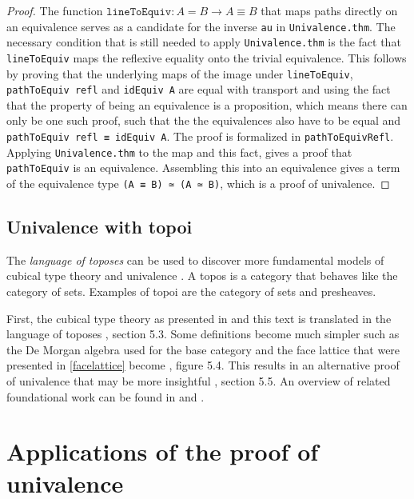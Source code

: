 \documentclass[12pt,a4paper,twoside,xetex]{book}
\newcommand{\keyword}[1]{\emph{#1}\index{#1}}
\newcommand{\op}[1]{\mathtt{#1}}
\begin{document}
\begin{proof}
The function $\op{lineToEquiv} : A = B \rightarrow A \equiv B$ that maps paths 
directly on an equivalence serves as a candidate for the inverse \texttt{au} in 
\texttt{Univalence.thm}. The necessary condition that is still needed to apply 
\texttt{Univalence.thm} is the fact that \texttt{lineToEquiv} maps the 
reflexive equality onto the trivial equivalence. This follows by proving that 
the underlying maps of the image under \texttt{lineToEquiv}, 
\texttt{pathToEquiv refl} and \texttt{idEquiv A} are equal with transport and 
using the fact that the property of being an equivalence is a proposition, 
which means there can only be one such proof, such that the the equivalences 
also have to be equal and \texttt{pathToEquiv refl ≡ idEquiv A}. The proof is 
formalized in \texttt{pathToEquivRefl}. Applying \texttt{Univalence.thm} to the 
map and this fact, gives a proof that \texttt{pathToEquiv} is an equivalence. 
Assembling this into an equivalence gives a term of the equivalence type 
\texttt{(A ≡ B) ≃ (A ≃ B)}, which is a proof of univalence.
\end{proof}

\subsection{Univalence with topoi}

The \keyword{language of toposes} can be used to discover more fundamental 
models of cubical type theory and univalence \cite{Orton2019}. A topos is a 
category that behaves like the category of sets. Examples of topoi are the 
category of sets and presheaves. 

First, the cubical type theory as presented in \cite{Huber2016} and this text 
is translated in the  language of toposes \cite{Orton2019}, section 5.3. Some 
definitions become much simpler such as the De Morgan algebra used for the base 
category and the face lattice that were presented in \cref{facelattice} become 
\cite{Orton2019}, figure 5.4. This results in an alternative proof of 
univalence that may be more insightful \cite{Orton2019}, section 5.5. An 
overview of related foundational work can be found in \cite{Pitts2018} and 
\cite{Licata2018}.


\section{Applications of the proof of univalence} \label{applications}
\end{document}
